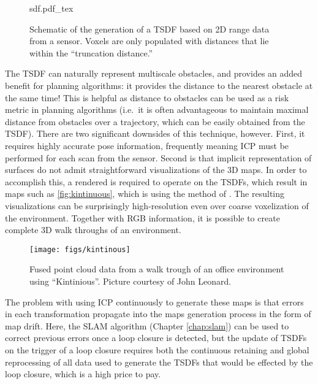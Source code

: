 \begin{figure}
    \centering
    \def\svgwidth{0.8\textwidth}
    {sdf.pdf_tex}
    \caption{Schematic of the generation of a TSDF based on 2D range data from a sensor. Voxels are only populated with distances that lie within the ``truncation distance.''\label{fig:sdf}}
\end{figure}

The TSDF can naturally represent multiscale obstacles, and provides an added
benefit for planning algorithms: it provides the distance to the nearest
obstacle at the same time! This is helpful as distance to obstacles can be used
as a risk metric in planning algorithms (i.e.\ it is often advantageous to
maintain maximal distance from obstacles over a trajectory, which can be easily
obtained from the TSDF). There are two significant downsides of this technique,
however.  First, it requires highly accurate pose information, frequently
meaning ICP must be performed for each scan from the sensor. Second is that
implicit representation of surfaces do not admit straightforward visualizations
of the 3D maps. In order to accomplish this, a rendered is required to operate
on the TSDFs, which result in maps such as \cref{fig:kintinuous}, which is using
the method of \cite{whelan2013robust}.  The resulting visualizations can be
surprisingly high-resolution even over coarse voxelization of the environment.
Together with RGB information, it is possible to create complete 3D walk
throughs of an environment.

\begin{figure}
    \centering
    \texttt{[image: figs/kintinous]}
    \caption{Fused point cloud data from a walk trough of an office environment using ``Kintinious''. Picture courtesy of John Leonard.\label{fig:kintinous}}
\end{figure}


The problem with using ICP continuously to generate these maps is that errors
in each transformation propagate into the maps generation process in the form
of map drift. Here, the SLAM algorithm (Chapter
\ref{chap:slam}) can be used to correct previous errors
once a loop closure is detected, but the update of TSDFs on the trigger of a loop
closure requires both the continuous retaining and global reprocessing of all
data used to generate the TSDFs that would be effected by the loop closure, which
is a high price to pay.


